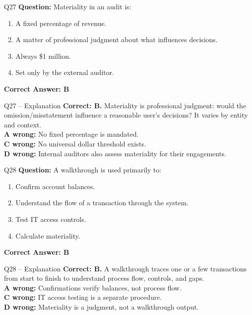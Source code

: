 \documentclass[aspectratio=169,10pt]{beamer}
\begin{document}
	\begin{frame}[t]{Q27}
		\small
		\textbf{Question:} Materiality in an audit is:
		\begin{enumerate}[label=\Alph*.,itemsep=1pt,topsep=2pt]
			\item A fixed percentage of revenue.
			\item A matter of professional judgment about what influences decisions.
			\item Always \$1 million.
			\item Set only by the external auditor.
		\end{enumerate}
		\vspace{4pt}
		\textbf{Correct Answer: B}
	\end{frame}
	
	\begin{frame}[t]{Q27 -- Explanation}
		\small
		\textbf{Correct: B.} Materiality is professional judgment: would the omission/misstatement influence a reasonable user's decisions? It varies by entity and context. \\[4pt]
		\textbf{A wrong:} No fixed percentage is mandated. \\[2pt]
		\textbf{C wrong:} No universal dollar threshold exists. \\[2pt]
		\textbf{D wrong:} Internal auditors also assess materiality for their engagements.
	\end{frame}
	
	\begin{frame}[t]{Q28}
		\small
		\textbf{Question:} A walkthrough is used primarily to:
		\begin{enumerate}[label=\Alph*.,itemsep=1pt,topsep=2pt]
			\item Confirm account balances.
			\item Understand the flow of a transaction through the system.
			\item Test IT access controls.
			\item Calculate materiality.
		\end{enumerate}
		\vspace{4pt}
		\textbf{Correct Answer: B}
	\end{frame}
	
	\begin{frame}[t]{Q28 -- Explanation}
		\small
		\textbf{Correct: B.} A walkthrough traces one or a few transactions from start to finish to understand process flow, controls, and gaps. \\[4pt]
		\textbf{A wrong:} Confirmations verify balances, not process flow. \\[2pt]
		\textbf{C wrong:} IT access testing is a separate procedure. \\[2pt]
		\textbf{D wrong:} Materiality is a judgment, not a walkthrough output.
	\end{frame}
	
\end{document}
